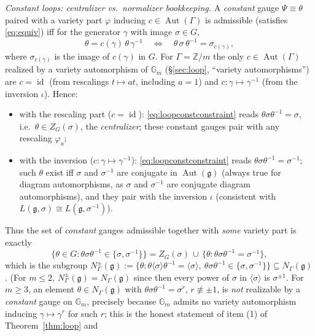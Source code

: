 \documentclass{amsart}
\theoremstyle{definition}
\DeclareMathOperator{\Aut}{Aut}
\DeclareMathOperator{\id}{id}
\newcommand{\Gm}{\mathbb{G}_m}
\newcommand{\g}{\mathfrak{g}}
\newcommand{\Z}{\mathbb{Z}}
\begin{document}
\emph{Constant loops: centralizer vs.\ normalizer bookkeeping.}  A
\emph{constant} gauge $\Psi\equiv\theta$ paired with a variety part
$\varphi$ inducing $c\in\Aut(\Gamma)$ is admissible (satisfies
\eqref{eq:equiv}) iff for the generator $\gamma$ with image $\sigma\in G$,
\begin{equation}\label{eq:loopconstconstraint}
\theta=c(\gamma)\,\theta\,\gamma^{-1}
\quad\Longleftrightarrow\quad
\theta\,\sigma\,\theta^{-1}=\sigma_{c(\gamma)},
\end{equation}
where $\sigma_{c(\gamma)}$ is the image of $c(\gamma)$ in $G$.  For
$\Gamma=\Z/m$ the only $c\in\Aut(\Gamma)$ realized by a variety
automorphism of $\Gm$ (\S\ref{sec:loop}, ``variety automorphisms'') are
$c=\id$ (from rescalings $t\mapsto at$, including $a=1$) and
$c\colon\gamma\mapsto\gamma^{-1}$ (from the inversion $\iota$).  Hence:
\begin{itemize}
\item with the rescaling part ($c=\id$): \eqref{eq:loopconstconstraint}
reads $\theta\sigma\theta^{-1}=\sigma$, i.e.\ $\theta\in Z_G(\sigma)$, the
\emph{centralizer}; these constant gauges pair with any rescaling
$\varphi_a$;
\item with the inversion ($c\colon\gamma\mapsto\gamma^{-1}$):
\eqref{eq:loopconstconstraint} reads $\theta\sigma\theta^{-1}=\sigma^{-1}$;
such $\theta$ exist iff $\sigma$ and $\sigma^{-1}$ are conjugate in
$\Aut(\g)$ (always true for diagram automorphisms, as $\sigma$ and
$\sigma^{-1}$ are conjugate diagram automorphisms), and they pair with the
inversion $\iota$ (consistent with $L(\g,\sigma)\cong L(\g,\sigma^{-1})$).
\end{itemize}
Thus the set of \emph{constant} gauges admissible together with \emph{some}
variety part is exactly
\[
\{\theta\in G:\theta\sigma\theta^{-1}\in\{\sigma,\sigma^{-1}\}\}
=Z_G(\sigma)\,\cup\,\{\theta:\theta\sigma\theta^{-1}=\sigma^{-1}\},
\]
which is the subgroup $N^{\pm}_\Gamma(\g):=\{\theta:\theta\langle\sigma
\rangle\theta^{-1}=\langle\sigma\rangle,\ \theta\sigma\theta^{-1}\in\{\sigma,
\sigma^{-1}\}\}\subseteq N_\Gamma(\g)$.  (For $m\le2$, $N^\pm_\Gamma(\g)=
N_\Gamma(\g)$ since then every power of $\sigma$ in $\langle\sigma\rangle$ is
$\sigma^{\pm1}$.  For $m\ge3$, an element $\theta\in N_\Gamma(\g)$ with
$\theta\sigma\theta^{-1}=\sigma^{r}$, $r\not\equiv\pm1$, is \emph{not}
realizable by a \emph{constant} gauge on $\Gm$, precisely because $\Gm$
admits no variety automorphism inducing $\gamma\mapsto\gamma^{r}$ for such
$r$; this is the honest statement of item (1) of Theorem~\ref{thm:loop} and
\end{document}
